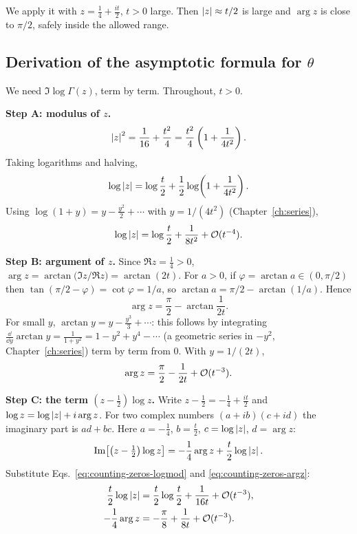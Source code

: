 We apply it with $z=\tfrac14+\tfrac{it}{2}$, $t>0$ large. Then $\left\lvert z\right\rvert\approx t/2$ is large and $\arg z$ is close to $\pi/2$, safely inside the allowed range.

\subsection{Derivation of the asymptotic formula for $\theta$}

We need $\Im\log\Gamma(z)$, term by term. Throughout, $t>0$.

\textbf{Step A: modulus of $z$.} 
\begin{equation}
\left\lvert z\right\rvert^2=\frac1{16}+\frac{t^2}{4}=\frac{t^2}{4}\left(1+\frac1{4t^2}\right).
\end{equation}
Taking logarithms and halving,
\begin{equation}
\log\left\lvert z\right\rvert=\log\frac t2+\frac12\log\!\left(1+\frac{1}{4t^2}\right).
\end{equation}
Using $\log(1+y)=y-\tfrac{y^2}{2}+\cdots$ with $y=1/(4t^2)$ (Chapter~\ref{ch:series}),
\begin{equation}
\log\left\lvert z\right\rvert=\log\frac t2+\frac{1}{8t^2}+\mathcal{O}(t^{-4}).
\label{eq:counting-zeros-logmod}
\end{equation}

\textbf{Step B: argument of $z$.} Since $\Re z=\tfrac14>0$, $\arg z=\arctan\!\bigl(\Im z/\Re z\bigr)=\arctan(2t)$. For $a>0$, if $\varphi=\arctan a\in(0,\pi/2)$ then $\tan(\pi/2-\varphi)=\cot\varphi=1/a$, so $\arctan a=\pi/2-\arctan(1/a)$. Hence
\begin{equation}
\arg z=\frac\pi2-\arctan\frac{1}{2t}.
\end{equation}
For small $y$, $\arctan y=y-\tfrac{y^3}{3}+\cdots$: this follows by integrating $\frac{\dd}{\dd y}\arctan y=\frac1{1+y^2}=1-y^2+y^4-\cdots$ (a geometric series in $-y^2$, Chapter~\ref{ch:series}) term by term from $0$. With $y=1/(2t)$,
\begin{equation}
\arg z=\frac\pi2-\frac{1}{2t}+\mathcal{O}(t^{-3}).
\label{eq:counting-zeros-argz}
\end{equation}

\textbf{Step C: the term $(z-\tfrac12)\log z$.} Write $z-\tfrac12=-\tfrac14+\tfrac{it}{2}$ and $\log z=\log\left\lvert z\right\rvert+i\arg z$. For two complex numbers $(a+ib)(c+id)$ the imaginary part is $ad+bc$. Here $a=-\tfrac14$, $b=\tfrac t2$, $c=\log\left\lvert z\right\rvert$, $d=\arg z$:
\begin{equation}
\operatorname{Im}\!\left[\left(z-\tfrac12\right)\log z\right]=-\frac14\arg z+\frac t2\log\left\lvert z\right\rvert.
\end{equation}
Substitute Eqs.~\eqref{eq:counting-zeros-logmod} and \eqref{eq:counting-zeros-argz}:
\begin{align}
\frac t2\log\left\lvert z\right\rvert&=\frac t2\log\frac t2+\frac{1}{16t}+\mathcal{O}(t^{-3}),\\
-\frac14\arg z&=-\frac\pi8+\frac{1}{8t}+\mathcal{O}(t^{-3}).
\end{align}


